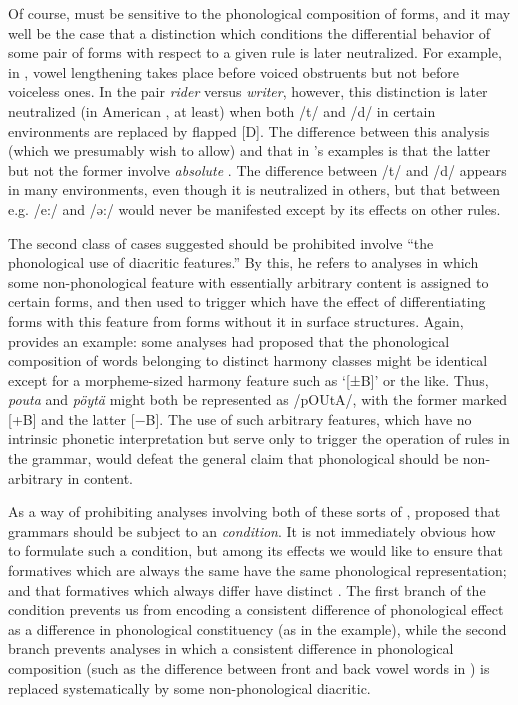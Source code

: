 Of course,  must be sensitive to the phonological
composition of forms, and it may well be the case that a distinction
which conditions the differential behavior of some pair of forms with
respect to a given rule is later neutralized. For example, in ,
vowel lengthening takes place before voiced obstruents but not before
voiceless ones. In the pair \textit{rider} versus \textit{writer},
however, this distinction is later neutralized (in American ,
at least) when both /t/ and /d/ in certain environments are replaced
by flapped [D]. The difference between this analysis (which we
presumably wish to allow) and that in {\Kiparsky}'s examples is that the
latter but not the former involve \textit{absolute}
. The difference between  /t/ and /d/ appears in
many environments, even though it is neutralized in others, but that
between e.g.  /e:/ and /ə:/ would never be manifested except
by its effects on other rules.

The second class of cases {\Kiparsky} suggested should be prohibited
involve ``the phonological use of diacritic features.'' By this, he
refers to analyses in which some non-phonological feature with
essentially arbitrary content is assigned to certain forms, and then
used to trigger  which have the effect of
differentiating forms with this feature from forms without it in
surface structures. Again,  provides an example: some
analyses had proposed that the phonological composition of words
belonging to distinct harmony classes might be identical except for a
morpheme-sized harmony feature such as `[±B]' or the like. Thus,
 \textit{pouta} and \textit{pöytä} might both be represented as
/pOUtA/, with the former marked [+B] and the latter [$-$B]. The use of
such arbitrary features, which have no intrinsic phonetic
interpretation but serve only to trigger the operation of rules in the
grammar, would defeat the general claim that phonological
 should be non-arbitrary in content.

As a way of prohibiting analyses involving both of these sorts of
, {\Kiparsky} proposed that grammars should be subject to an
\textit{ condition}. It is not immediately obvious how to
formulate such a condition, but among its effects we would like to
ensure that formatives which are always the same have the same
phonological representation; and that formatives which always differ
have distinct . The first branch of the
condition prevents us from encoding a consistent difference of
phonological effect as a difference in phonological constituency (as
in the  example), while the second branch prevents analyses
in which a consistent difference in phonological composition (such as
the difference between front and back vowel words in ) is
replaced systematically by some non-phonological diacritic.

